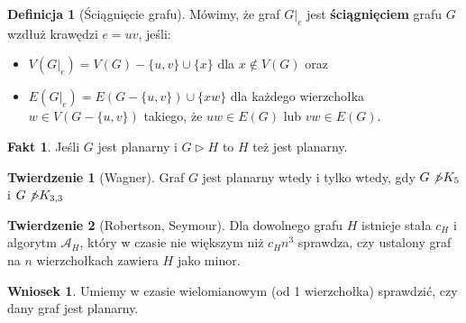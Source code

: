\documentclass[a4paper,12pt]{article}
\theoremstyle{definition}%
\newtheorem{remark}{Wniosek}%
\newtheorem{theorem}{Twierdzenie}%
\newtheorem*{fact*}{Fakt} %
\theoremstyle{definition}
\newtheorem{definition}{Definicja}%
\theoremstyle{problem}
\begin{document}
\begin{definition}[Ściągnięcie grafu]
Mówimy, że graf $G|_e$ jest \textbf{ściągnięciem} grafu $G$ wzdłuż krawędzi $e = uv$, jeśli:
\begin{itemize}
\item[] $V (G|_e) = V (G) - \{u, v\} \cup \{x\}$ dla $x \not \in V (G)$ oraz
\item[] $E (G|_e) = E (G - \{u, v\})\cup \{xw\}$ dla każdego wierzchołka $w \in V (G-\{u, v\})$ takiego, że $uw \in E(G)$ lub $vw \in E(G)$.
\end{itemize}
\end{definition}

\begin{fact*}
Jeśli $G$ jest planarny i $G\triangleright H$ to $H$ też jest planarny.
\end{fact*}

\begin{theorem}[Wagner]\label{the:Wagner} Graf $G$ jest planarny wtedy i tylko wtedy, gdy $G\not \triangleright K_5$ i $G\not \triangleright K_{3,3}$
\end{theorem}

\begin{theorem}[Robertson, Seymour]\label{the:RobertsonSeymour} Dla dowolnego grafu $H$ istnieje stała $c_H$ i algorytm $\mathcal{A}_H$, który w czasie nie większym niż $c_H n^3$ sprawdza, czy ustalony graf na $n$ wierzchołkach zawiera $H$ jako minor.
\end{theorem}
\begin{remark}
Umiemy w czasie wielomianowym (od 1 wierzchołka) sprawdzić, czy dany graf jest planarny.
\end{remark}
\end{document}
